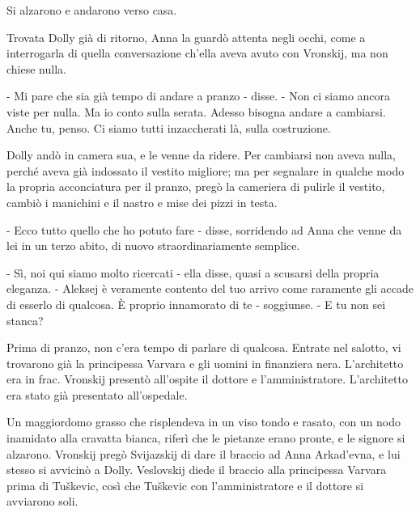 Si alzarono e andarono verso casa. 

Trovata Dolly già di ritorno, Anna la guardò attenta negli occhi, come a interrogarla di quella conversazione ch'ella aveva avuto con Vronskij, ma non chiese nulla. 

- Mi pare che sia già tempo di andare a pranzo - disse. - Non ci siamo ancora viste per nulla. Ma io conto sulla serata. Adesso bisogna andare a cambiarsi. Anche tu, penso. Ci siamo tutti inzaccherati là, sulla costruzione. 

Dolly andò in camera sua, e le venne da ridere. Per cambiarsi non aveva nulla, perché aveva già indossato il vestito migliore; ma per segnalare in qualche modo la propria acconciatura per il pranzo, pregò la cameriera di pulirle il vestito, cambiò i manichini e il nastro e mise dei pizzi in testa. 

- Ecco tutto quello che ho potuto fare - disse, sorridendo ad Anna che venne da lei in un terzo abito, di nuovo straordinariamente semplice. 

- Sì, noi qui siamo molto ricercati - ella disse, quasi a scusarsi della propria eleganza. - Aleksej è veramente contento del tuo arrivo come raramente gli accade di esserlo di qualcosa. È proprio innamorato di te - soggiunse. - E tu non sei stanca? 

Prima di pranzo, non c'era tempo di parlare di qualcosa. Entrate nel salotto, vi trovarono già la principessa Varvara e gli uomini in finanziera nera. L'architetto era in frac. Vronskij presentò all'ospite il dottore e l'amministratore. L'architetto era stato già presentato all'ospedale. 

Un maggiordomo grasso che risplendeva in un viso tondo e rasato, con un nodo inamidato alla cravatta bianca, riferì che le pietanze erano pronte, e le signore si alzarono. Vronskij pregò Svijazskij di dare il braccio ad Anna Arkad'evna, e lui stesso si avvicinò a Dolly. Veslovskij diede il braccio alla principessa Varvara prima di Tuškevic, così che Tuškevic con l'amministratore e il dottore si avviarono soli. 

